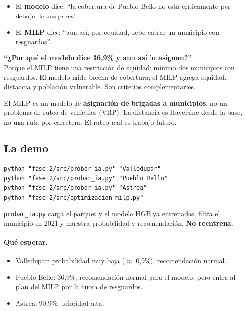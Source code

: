 \documentclass[11pt,a4paper]{article}
\newcommand{\code}[1]{\texttt{#1}}
\begin{document}
\begin{itemize}[leftmargin=*]
  \item El \textbf{modelo} dice: ``la cobertura de Pueblo Bello no está críticamente por debajo de sus pares''.
  \item El \textbf{MILP} dice: ``aun así, por equidad, debe entrar un municipio con resguardos''.
\end{itemize}

\begin{tcolorbox}[frase,title={Pregunta típica}]
\textbf{``¿Por qué el modelo dice 36,9\% y aun así lo asignan?''}\\
Porque el MILP tiene una restricción de equidad: mínimo dos municipios con resguardos. El modelo mide brecha de cobertura; el MILP agrega equidad, distancia y población vulnerable. Son criterios complementarios.
\end{tcolorbox}

\begin{tcolorbox}[ojo,title={No es ruteo}]
El MILP es un modelo de \textbf{asignación de brigadas a municipios}, no un problema de ruteo de vehículos (VRP). La distancia es Haversine desde la base, no una ruta por carretera. El ruteo real es trabajo futuro.
\end{tcolorbox}

\subsection{La demo}

\begin{verbatim}
python "fase 2/src/probar_ia.py" "Valledupar"
python "fase 2/src/probar_ia.py" "Pueblo Bello"
python "fase 2/src/probar_ia.py" "Astrea"
python "fase 2/src/optimizacion_milp.py"
\end{verbatim}

\code{probar_ia.py} carga el parquet y el modelo HGB ya entrenados, filtra el municipio en 2021 y muestra probabilidad y recomendación. \textbf{No reentrena.}

\paragraph{Qué esperar.}
\begin{itemize}[leftmargin=*]
  \item Valledupar: probabilidad muy baja ($\approx$ 0,9\%), recomendación normal.
  \item Pueblo Bello: 36,9\%, recomendación normal para el modelo, pero entra al plan del MILP por la cuota de resguardos.
  \item Astrea: 90,9\%, prioridad alta.
\end{itemize}
\end{document}
